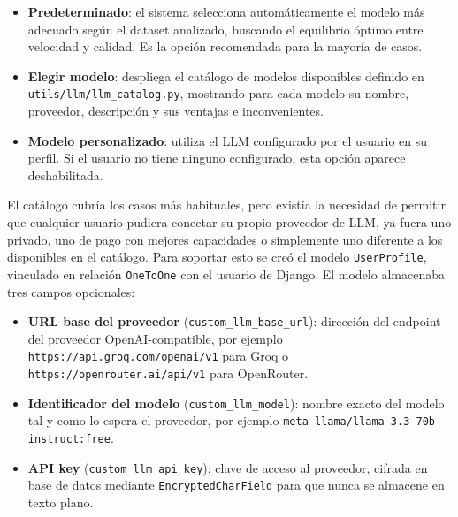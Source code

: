\begin{itemize}
    \item \textbf{Predeterminado}: el sistema selecciona automáticamente el 
    modelo más adecuado según el dataset analizado, buscando el equilibrio 
    óptimo entre velocidad y calidad. Es la opción recomendada para la 
    mayoría de casos.
    
    \item \textbf{Elegir modelo}: despliega el catálogo de modelos disponibles 
    definido en \\ \texttt{utils/llm/llm\_catalog.py}, mostrando para cada modelo 
    su nombre, proveedor, descripción y sus ventajas e inconvenientes.
    
    \item \textbf{Modelo personalizado}: utiliza el LLM configurado por el 
    usuario en su perfil. Si el usuario no tiene ninguno configurado, esta 
    opción aparece deshabilitada.
\end{itemize}

El catálogo cubría los casos más habituales, pero existía la necesidad de 
permitir que cualquier usuario pudiera conectar su propio proveedor de LLM, 
ya fuera uno privado, uno de pago con mejores capacidades o simplemente uno 
diferente a los disponibles en el catálogo. Para soportar esto se creó el 
modelo \texttt{UserProfile}, vinculado en relación \texttt{OneToOne} con el 
usuario de Django. El modelo almacenaba tres campos opcionales:

\begin{itemize}
    \item \textbf{URL base del proveedor} (\texttt{custom\_llm\_base\_url}): 
    dirección del endpoint del proveedor OpenAI-compatible, por ejemplo 
    \texttt{https://api.groq.com/openai/v1} para Groq o 
    \texttt{https://openrouter.ai/api/v1} para OpenRouter.
    
    \item \textbf{Identificador del modelo} (\texttt{custom\_llm\_model}): 
    nombre exacto del modelo tal y como lo espera el proveedor, por ejemplo 
    \texttt{meta-llama/llama-3.3-70b-instruct:free}.
    
    \item \textbf{API key} (\texttt{custom\_llm\_api\_key}): clave de acceso 
    al proveedor, cifrada en base de datos mediante \texttt{EncryptedCharField} 
    para que nunca se almacene en texto plano.
\end{itemize}


